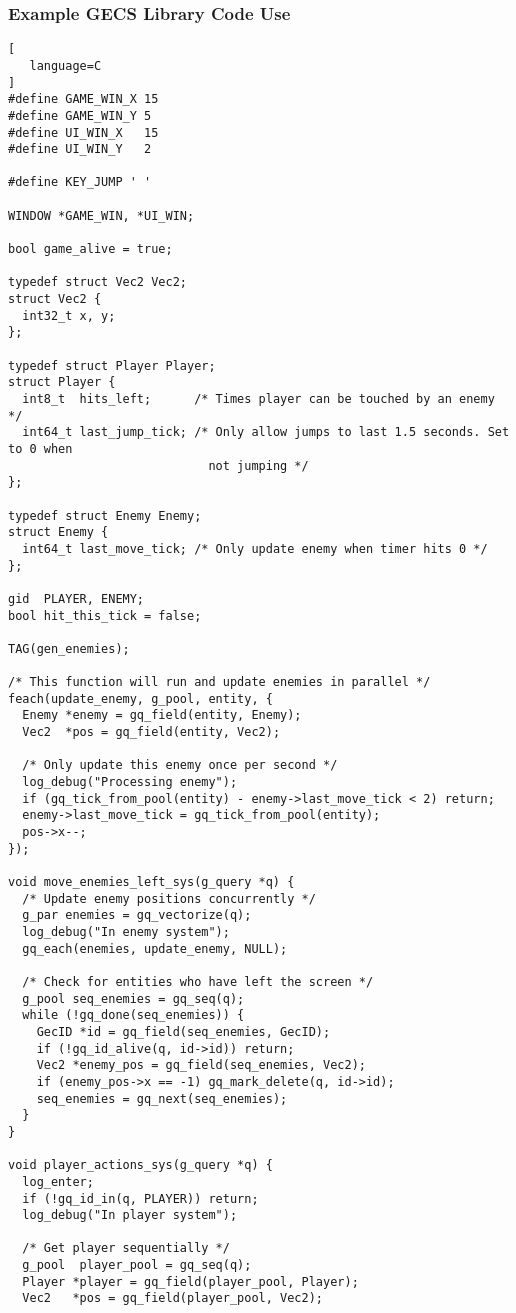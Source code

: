 \subsubsection{Example GECS Library Code Use}
\label{appendix:code_example_1}
\begin{lstlisting}[
   language=C
]
#define GAME_WIN_X 15
#define GAME_WIN_Y 5
#define UI_WIN_X   15
#define UI_WIN_Y   2

#define KEY_JUMP ' '

WINDOW *GAME_WIN, *UI_WIN;

bool game_alive = true;

typedef struct Vec2 Vec2;
struct Vec2 {
  int32_t x, y;
};

typedef struct Player Player;
struct Player {
  int8_t  hits_left;      /* Times player can be touched by an enemy */
  int64_t last_jump_tick; /* Only allow jumps to last 1.5 seconds. Set to 0 when
                            not jumping */
};

typedef struct Enemy Enemy;
struct Enemy {
  int64_t last_move_tick; /* Only update enemy when timer hits 0 */
};

gid  PLAYER, ENEMY;
bool hit_this_tick = false;

TAG(gen_enemies);

/* This function will run and update enemies in parallel */
feach(update_enemy, g_pool, entity, {
  Enemy *enemy = gq_field(entity, Enemy);
  Vec2  *pos = gq_field(entity, Vec2);

  /* Only update this enemy once per second */
  log_debug("Processing enemy");
  if (gq_tick_from_pool(entity) - enemy->last_move_tick < 2) return;
  enemy->last_move_tick = gq_tick_from_pool(entity);
  pos->x--;
});

void move_enemies_left_sys(g_query *q) {
  /* Update enemy positions concurrently */
  g_par enemies = gq_vectorize(q);
  log_debug("In enemy system");
  gq_each(enemies, update_enemy, NULL);

  /* Check for entities who have left the screen */
  g_pool seq_enemies = gq_seq(q);
  while (!gq_done(seq_enemies)) {
    GecID *id = gq_field(seq_enemies, GecID);
    if (!gq_id_alive(q, id->id)) return;
    Vec2 *enemy_pos = gq_field(seq_enemies, Vec2);
    if (enemy_pos->x == -1) gq_mark_delete(q, id->id);
    seq_enemies = gq_next(seq_enemies);
  }
}

void player_actions_sys(g_query *q) {
  log_enter;
  if (!gq_id_in(q, PLAYER)) return;
  log_debug("In player system");

  /* Get player sequentially */
  g_pool  player_pool = gq_seq(q);
  Player *player = gq_field(player_pool, Player);
  Vec2   *pos = gq_field(player_pool, Vec2);


\end{lstlisting}
